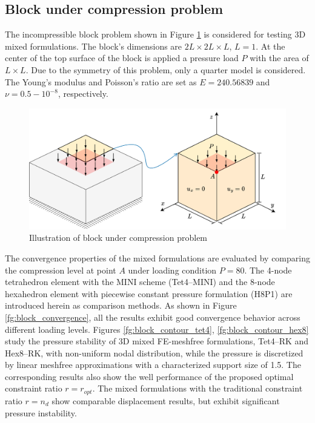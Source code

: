 \subsection{Block under compression problem}
The incompressible block problem \cite{reese2000} shown in Figure \ref{fg:block_model} is considered for testing 3D mixed formulations. The block's dimensions are $2L\times 2L \times L$, $L=1$.
At the center of the top surface of the block is applied a pressure load $P$ with the area of $L\times L$.
Due to the symmetry of this problem, only a quarter model is considered.
The Young's modulus and Poisson's ratio are set as $E = 240.56839$ and $\nu = 0.5-10^{-8}$, respectively.

\begin{figure}[H]
\centering
\includegraphics[width=\textwidth]{block_model_r1.png}
\caption{Illustration of block under compression problem}\label{fg:block_model}
\end{figure}

The convergence properties of the mixed formulations are evaluated by comparing the compression level at point $A$ under loading condition $P = 80$.
The 4-node tetrahedron element with the MINI scheme (Tet4--MINI) and the 8-node hexahedron element with piecewise constant pressure formulation (H8P1) are introduced herein as comparison methods.
As shown in Figure \ref{fg:block_convergence}, all the results exhibit good convergence behavior across different loading levels.
Figures \ref{fg:block_contour_tet4}, \ref{fg:block_contour_hex8} study the pressure stability of 3D mixed FE-meshfree formulations, Tet4--RK and Hex8--RK, with non-uniform nodal distribution, while the pressure is discretized by linear meshfree approximations with a characterized support size of 1.5. The corresponding results also show the well performance of the proposed optimal constraint ratio $r=r_{opt}$. The mixed formulations with the traditional constraint ratio $r=n_d$ show comparable displacement results, but exhibit significant pressure instability.

